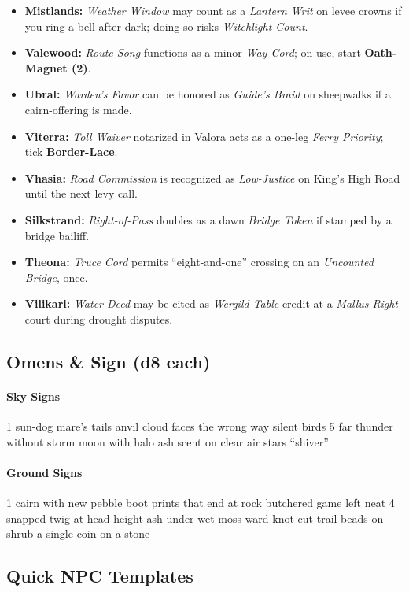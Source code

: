\begin{itemize}
\item \textbf{Mistlands:} \emph{Weather Window} may count as a \emph{Lantern Writ} on levee crowns if you ring a bell after dark; doing so risks \emph{Witchlight Count}.
\item \textbf{Valewood:} \emph{Route Song} functions as a minor \emph{Way-Cord}; on use, start \textbf{Oath-Magnet (2)}.
\item \textbf{Ubral:} \emph{Warden’s Favor} can be honored as \emph{Guide’s Braid} on sheepwalks if a cairn-offering is made.
\item \textbf{Viterra:} \emph{Toll Waiver} notarized in Valora acts as a one-leg \emph{Ferry Priority}; tick \textbf{Border-Lace}.
\item \textbf{Vhasia:} \emph{Road Commission} is recognized as \emph{Low-Justice} on King’s High Road until the next levy call.
\item \textbf{Silkstrand:} \emph{Right-of-Pass} doubles as a dawn \emph{Bridge Token} if stamped by a bridge bailiff.
\item \textbf{Theona:} \emph{Truce Cord} permits “eight-and-one” crossing on an \emph{Uncounted Bridge}, once.
\item \textbf{Vilikari:} \emph{Water Deed} may be cited as \emph{Wergild Table} credit at a \emph{Mallus Right} court during drought disputes.
\end{itemize}
\subsection*{Omens \& Sign (d8 each)}

\paragraph{Sky Signs}
1 sun-dog  mare’s tails  anvil cloud faces the wrong way  silent birds  
5 far thunder without storm  moon with halo  ash scent on clear air  stars “shiver”

\paragraph{Ground Signs}
1 cairn with new pebble  boot prints that end at rock  butchered game left neat  
4 snapped twig at head height  ash under wet moss  ward-knot cut  trail beads on shrub  a single coin on a stone
\subsection*{Quick NPC Templates}


